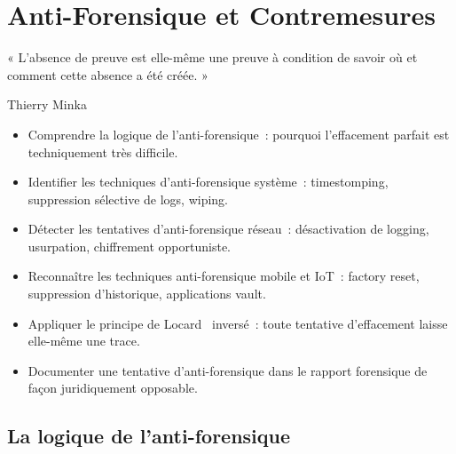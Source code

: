 
\chapter{Anti-Forensique et Contremesures}
\label{chap:anti-for}

\epigraph{%
    « L'absence de preuve est elle-même une preuve à condition
    de savoir où et comment cette absence a été créée. »%
}{Thierry Minka}


\begin{boxobjectifs}
\begin{itemize}
    \item Comprendre la logique de l'anti-forensique~: pourquoi
          l'effacement parfait est techniquement très difficile.
    \item Identifier les techniques d'anti-forensique système~:
          timestomping, suppression sélective de logs, wiping.
    \item Détecter les tentatives d'anti-forensique réseau~:
          désactivation de logging, usurpation, chiffrement opportuniste.
    \item Reconnaître les techniques anti-forensique mobile et IoT~:
          factory reset, suppression d'historique, applications vault.
    \item Appliquer le principe de Locard~\cite{locard1920} inversé~: toute tentative
          d'effacement laisse elle-même une trace.
    \item Documenter une tentative d'anti-forensique dans le rapport
          forensique de façon juridiquement opposable.
\end{itemize}
\end{boxobjectifs}

\bigskip

\section*{La logique de l'anti-forensique}

